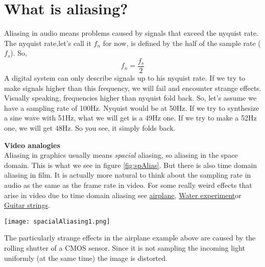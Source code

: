 \section{What is aliasing?}
Aliasing in audio means problems caused by signals that exceed the nyquist rate.\\
The nyquist rate,let's call it $f_n$ for now, is defined by the half of the sample rate ($f_s$). So,
\begin{equation}
	f_n=\frac{f_s}{2}
\end{equation}
A digital system can only describe signals up to his nyquist rate. If we try to make signals higher than this frequency, we will fail and encounter strange effects.\\
Visually speaking, frequencies higher than nyquist fold back. So, let's assume we have a sampling rate of 100Hz. Nyquist would be at 50Hz. If we try to synthesize a sine wave with 51Hz, what we will get is a 49Hz one. If we try to make a 52Hz one, we will get 48Hz. So you see, it simply folds back.

\begin{framed}
	\textbf{Video analogies}\\
	Aliasing in graphics usually means \textit{spacial} aliasing, so aliasing in the space domain. This is what we see in figure \ref{fig:spAlias}. But there is also time domain aliasing in film. It is actually more natural to think about the sampling rate in audio as the same as the frame rate in video. For some really weird effects that arise in video due to time domain aliasing see \href{https://www.youtube.com/watch?v=LVwmtwZLG88}{airplane}\footnotemark , \href{https://www.youtube.com/watch?v=GBtHeR-hY9Y}{Water experiment}\footnotemark or \href{https://www.youtube.com/watch?v=jcOKTTnOIV8}{Guitar strings}\footnotemark .
	\begin{center}
		\texttt{[image: spacialAliasing1.png]}
		\label{fig:spAlias}
	\end{center}
	The particularly strange effects in the airplane example above are caused by the rolling shutter of a CMOS sensor. Since it is not sampling the incoming light uniformly (at the same time) the image is distorted.
\end{framed}


